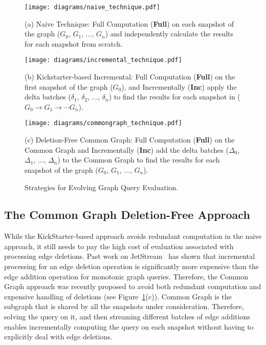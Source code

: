 \begin{figure}[!h]
    \centering
    \texttt{[image: diagrams/naive\_technique.pdf]}

    \vspace{0.05in}
    (a) \textsf{Naive Technique}: Full Computation (\textbf{Full}) on each snapshot of the graph ($G_0$, $G_1$, ..., $G_n$) and independently calculate the results for each snapshot from scratch.
    \vspace{0.15in}
    
    \texttt{[image: diagrams/incremental\_technique.pdf]}

    \vspace{0.05in}
    (b) \textsf{Kickstarter-based Incremental}: Full Computation (\textbf{Full}) on the first snapshot of the graph ($G_0$), and Incrementally (\textbf{Inc}) apply the delta batches ($\delta_1$, $\delta_2$, ..., $\delta_n$) to find the results for each snapshot in ($G_0 \rightarrow G_1 \rightarrow \cdots G_n$).
    \vspace{0.1in}

    \texttt{[image: diagrams/commongraph\_technique.pdf]}

    \vspace{0.05in}
    (c) \textsf{Deletion-Free Common Graph}: Full Computation (\textbf{Full}) on the Common Graph and Incrementally (\textbf{Inc}) add the delta batches ($\Delta_0$, $\Delta_1$, ..., $\Delta_n$) to the Common Graph to find the results for each snapshot of the graph ($G_0$, $G_1$, ..., $G_n$).
    \vspace{-0.05in}
    
    \caption{Strategies for Evolving Graph Query Evaluation.}
    \label{fig:evolving_approaches}
    \vspace{-0.25in}
\end{figure}

\subsection{The Common Graph Deletion-Free Approach}
While the KickStarter-based approach avoids redundant computation in the naive approach, it still needs to pay the high cost of evaluation associated with processing edge deletions. Past work on JetStream~\cite{jetstream} has shown that incremental processing for an edge deletion operation is significantly more expensive than the edge addition operation for monotonic graph queries. Therefore, the Common Graph approach was recently proposed to avoid both redundant computation and expensive handling of deletions (see Figure~\ref{fig:evolving_approaches}(c)). Common Graph is the subgraph that is shared by all the snapshots under consideration. Therefore, solving the query on it, and then streaming different batches of edge additions enables incrementally computing the query on each snapshot without having to explicitly deal with edge deletions. 

